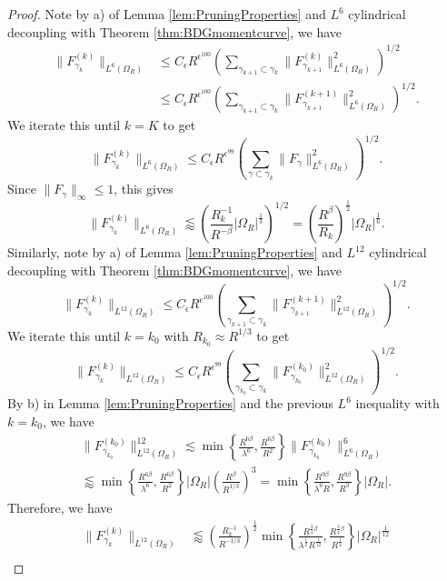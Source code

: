 \documentclass[12pt]{amsart}
\begin{document}
\begin{proof}
    Note by a) of Lemma \ref{lem:PruningProperties} and $L^{6}$ cylindrical decoupling with Theorem \ref{thm:BDGmomentcurve}, we have \begin{align*}
        \|F_{\gamma_k}^{(k)}\|_{L^{6}(\Omega_R)}&\le C_\epsilon R^{\epsilon^{100}}\left(\sum_{\gamma_{k+1}\subset \gamma_k}\|F_{\gamma_{k+1}}^{(k)}\|_{L^{6}(\Omega_R)}^2\right)^{1/2}\\
        &\le C_\epsilon R^{\epsilon^{100}}\left(\sum_{\gamma_{k+1}\subset \gamma_k}\|F_{\gamma_{k+1}}^{(k+1)}\|_{L^{6}(\Omega_R)}^2\right)^{1/2}.
    \end{align*} We iterate this until $k=K$ to get $$\|F_{\gamma_k}^{(k)}\|_{L^{6}(\Omega_R)}\le C_\epsilon R^{\epsilon^{99}}\left(\sum_{\gamma\subset \gamma_k}\|F_{\gamma}\|_{L^{6}(\Omega_R)}^2\right)^{1/2}.$$ Since $\|F_\gamma\|_\infty\le 1$, this gives $$\|F_{\gamma_k}^{(k)}\|_{L^{6}(\Omega_R)}\lessapprox \left(\frac{R_k^{-1}}{R^{-\beta}}|\Omega_R|^{\frac{1}{3}}\right)^{1/2}= \left(\frac{R^\beta}{R_k}\right)^{\frac{1}{2}}|\Omega_R|^{\frac{1}{6}}.$$
    Similarly, note by a) of Lemma \ref{lem:PruningProperties} and $L^{12}$ cylindrical decoupling with Theorem \ref{thm:BDGmomentcurve}, we have $$\|F_{\gamma_k}^{(k)}\|_{L^{12}(\Omega_R)}\le C_\epsilon R^{\epsilon^{100}}\left(\sum_{\gamma_{k+1}\subset \gamma_k}\|F_{\gamma_{k+1}}^{(k+1)}\|_{L^{12}(\Omega_R)}^2\right)^{1/2}.$$ We iterate this until $k=k_0$ with $R_{k_0}\approx R^{1/3}$ to get $$\|F_{\gamma_k}^{(k)}\|_{L^{12}(\Omega_R)}\le C_\epsilon R^{\epsilon^{99}}\left(\sum_{\gamma_{k_0}\subset \gamma_{k}}\|F_{\gamma_{k_0}}^{(k_0)}\|_{L^{12}(\Omega_R)}^2\right)^{1/2}.$$ By b) in Lemma \ref{lem:PruningProperties} and the previous $L^6$ inequality with $k=k_0$, we have \begin{multline*}
\|F_{\gamma_{k_0}}^{(k_0)}\|_{L^{12}(\Omega_R)}^{12}\lesssim \min \left\{\frac{R^{6\beta}}{\lambda^6}, \frac{R^{6\beta}}{R^2}\right\}\|F_{\gamma_{k_0}}^{(k_0)}\|_{L^{6}(\Omega_R)}^{6}\\\lessapprox  \min \left\{\frac{R^{6\beta}}{\lambda^6}, \frac{R^{6\beta}}{R^2}\right\}|\Omega_R| \left(\frac{R^\beta}{R^{1/3}}\right)^{3} = \min\left\{\frac{R^{9\beta}}{\lambda^6R}, \frac{R^{9\beta}}{R^3}\right\}|\Omega_R|.
    \end{multline*}
    Therefore, we have \begin{align*}
        \|F_{\gamma_k}^{(k)}\|_{L^{12}(\Omega_R)}&\lessapprox \left(\frac{R_k^{-1}}{R^{-1/3}}\right)^{\frac{1}{2}}\min\left\{\frac{R^{\frac{3}{4}\beta}}{\lambda^{\frac{1}{2}}R^{\frac{1}{12}}}, \frac{R^{\frac{3}{4}\beta}}{R^{\frac{1}{4}}}\right\}|\Omega_R|^{\frac{1}{12}}\\

\end{align*}
\end{proof}
\end{document}
